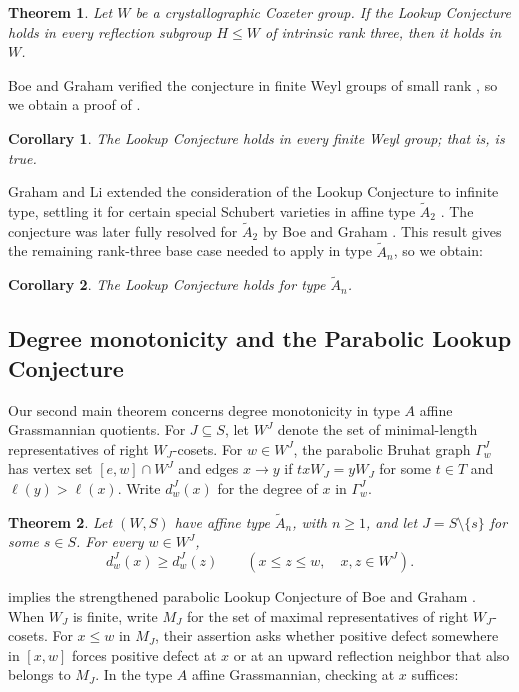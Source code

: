 \documentclass[11pt]{amsart}
\newtheorem{theorem}{Theorem}[section]
\newtheorem{corollary}[corollary]{Corollary}
\theoremstyle{definition}
\theoremstyle{remark}
\numberwithin{equation}{section}
\begin{document}
\begin{theorem}\label{thm:main}
Let $W$ be a crystallographic Coxeter group. If the Lookup
Conjecture holds in every reflection subgroup $H \leq W$ of intrinsic
rank three, then it holds in $W$.
\end{theorem}

Boe and Graham verified the conjecture in finite Weyl groups of
small rank \cite[p.~319]{BG}, so we obtain a proof of . 

\begin{corollary}\label{cor:finite}
The Lookup Conjecture holds in every finite Weyl group; that is,  is true.
\end{corollary}

Graham and Li extended the consideration of the Lookup Conjecture to infinite type, settling it for certain special Schubert varieties in affine type $\widetilde A_2$ \cite{GL}. The conjecture was later fully resolved for $\widetilde{A}_2$ by Boe and Graham \cite{BGAffine}. This result gives the remaining rank-three base case needed to apply  in type $\widetilde{A}_n$, so we obtain:

\begin{corollary}\label{cor:affine}
The Lookup Conjecture holds for type $\widetilde{A}_n$.
\end{corollary}

\subsection{Degree monotonicity and the Parabolic Lookup Conjecture}

Our second main theorem concerns degree monotonicity in type $A$
affine Grassmannian quotients.
For $J\subseteq S$, let $W^J$ denote the set of minimal-length representatives
of right $W_J$-cosets.
For $w\in W^J$, the parabolic Bruhat graph $\Gamma_w^J$ has vertex set
$[e,w]\cap W^J$ and edges $x\to y$ if
$txW_J=yW_J$ for some $t\in T$ and $\ell(y)>\ell(x)$.
Write $d_w^J(x)$ for the degree of $x$ in $\Gamma_w^J$.

\begin{theorem}\label{thm:grassmannian}
Let $(W,S)$ have affine type $\widetilde A_n$, with $n\ge1$,
and let $J=S\setminus\{s\}$ for some $s\in S$.
For every $w\in W^J$,
\[
 d_w^J(x)\ge d_w^J(z)
 \qquad(x\le z\le w,\quad x,z\in W^J).
\]
\end{theorem}


 implies the strengthened parabolic Lookup Conjecture of
Boe and Graham \cite[Conj.~1.2]{BG}.
When $W_J$ is finite, write $M_J$ for the set of maximal
representatives of right $W_J$-cosets. For $x\le w$ in $M_J$,
their assertion asks whether positive defect somewhere in $[x,w]$
forces positive defect at $x$ or at an upward reflection
neighbor that also belongs to $M_J$.
In the type $A$ affine Grassmannian, checking at $x$ suffices:
\end{document}
